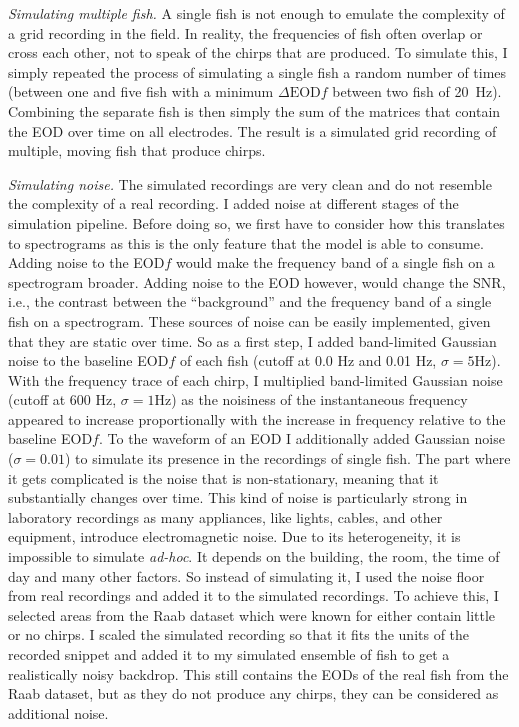 \emph{Simulating multiple fish.} A single fish is not enough to emulate the
complexity of a grid recording in the field. In reality, the frequencies of
fish often overlap or cross each other, not to speak of the chirps that are
produced. To simulate this, I simply repeated the process of simulating a
single fish a random number of times (between one and five fish
with a minimum $\Delta\text{EOD}f$ between two fish of \SI{20}{\hertz}).
Combining the separate fish is then simply the sum of the matrices that contain
the EOD over time on all electrodes. The result is a simulated grid recording
of multiple, moving fish that produce chirps.

\emph{Simulating noise.} The simulated recordings are very clean and do not
resemble the complexity of a real recording. I added noise at different stages
of the simulation pipeline. Before doing so, we first have to consider how this
translates to spectrograms as this is the only feature that the model is able
to consume. Adding noise to the EOD$f$ would make the frequency band of a
single fish on a spectrogram broader. Adding noise to the EOD however, would
change the \acrfull{SNR}, i.e., the contrast between the \enquote{background}
and the frequency band of a single fish on a spectrogram. These sources of
noise can be easily implemented, given that they are static over time. So as a
first step, I added band-limited Gaussian noise to the baseline EOD$f$ of each
fish (cutoff at 0.0 \si{\hertz} and 0.01 \si{\hertz}, $\sigma = 5
\si{\hertz}$). With the frequency trace of each chirp, I multiplied
band-limited Gaussian noise (cutoff at 600 \si{\hertz}, $\sigma = 1
\si{\hertz}$) as the noisiness of the instantaneous frequency appeared to
increase proportionally with the increase in frequency relative to the baseline
EOD$f$. To the waveform of an EOD I additionally added Gaussian noise ($\sigma
= 0.01$) to simulate its presence in the recordings of single fish. The part
where it gets complicated is the noise that is non-stationary, meaning that it
substantially changes over time. This kind of noise is particularly strong in
laboratory recordings as many appliances, like lights, cables, and other
equipment, introduce electromagnetic noise. Due to its heterogeneity, it is
impossible to simulate \textit{ad-hoc}. It depends on the building, the room,
the time of day and many other factors. So instead of simulating it, I used the
noise floor from real recordings and added it to the simulated recordings. To
achieve this, I selected areas from the Raab dataset which were known for
either contain little or no chirps. I scaled the simulated recording so that it
fits the units of the recorded snippet and added it to my simulated ensemble of
fish to get a realistically noisy backdrop. This still contains the EODs of the
real fish from the Raab dataset, but as they do not produce any chirps, they
can be considered as additional noise.

